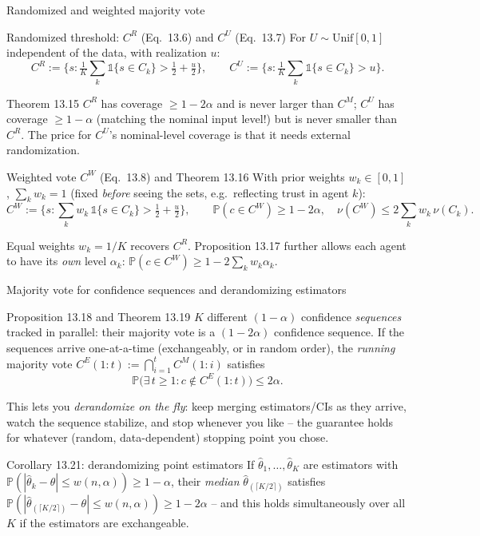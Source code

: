 \documentclass[aspectratio=169,10pt]{beamer}
\newcommand{\Pb}{\mathbb{P}}
\begin{document}
\begin{frame}{Randomized and weighted majority vote}
  \begin{block}{Randomized threshold: $C^R$ (Eq.\ 13.6) and $C^U$ (Eq.\ 13.7)}
    For $U\sim\mathrm{Unif}[0,1]$ independent of the data, with realization $u$:
    \[
      C^R := \Big\{s : \tfrac1K\textstyle\sum_k\mathbb{1}\{s\in C_k\} > \tfrac12+\tfrac u2\Big\}, \qquad
      C^U := \Big\{s : \tfrac1K\textstyle\sum_k\mathbb{1}\{s\in C_k\} > u\Big\}.
    \]
  \end{block}
  \begin{block}{Theorem 13.15}
    $C^R$ has coverage $\geq1-2\alpha$ and is never larger than $C^M$; $C^U$ has coverage $\geq1-\alpha$ (matching the nominal input level!) but is never smaller than $C^R$. The price for $C^U$'s nominal-level coverage is that it needs external randomization.
  \end{block}

  \begin{block}{Weighted vote $C^W$ (Eq.\ 13.8) and Theorem 13.16}
    With prior weights $w_k\in[0,1]$, $\sum_k w_k=1$ (fixed \emph{before} seeing the sets, e.g.\ reflecting trust in agent $k$):
    \[
      C^W := \Big\{s : \textstyle\sum_k w_k\,\mathbb{1}\{s\in C_k\} > \tfrac12+\tfrac u2\Big\}, \qquad
      \Pb(c\in C^W)\geq1-2\alpha, \quad \nu(C^W)\leq 2\textstyle\sum_k w_k\,\nu(C_k).
    \]
  \end{block}
  Equal weights $w_k=1/K$ recovers $C^R$. Proposition 13.17 further allows each agent to have its \emph{own} level $\alpha_k$: $\Pb(c\in C^W)\geq1-2\sum_k w_k\alpha_k$.
\end{frame}

\begin{frame}{Majority vote for confidence sequences and derandomizing estimators}
  \begin{block}{Proposition 13.18 and Theorem 13.19}
    $K$ different $(1-\alpha)$ confidence \emph{sequences} tracked in parallel: their majority vote is a $(1-2\alpha)$ confidence sequence. If the sequences arrive one-at-a-time (exchangeably, or in random order), the \emph{running} majority vote $C^E(1{:}t) := \bigcap_{i=1}^t C^M(1{:}i)$ satisfies
    \[
      \Pb\big(\exists\, t\geq1 : c\notin C^E(1{:}t)\big) \leq 2\alpha.
    \]
  \end{block}
  This lets you \emph{derandomize on the fly}: keep merging estimators/CIs as they arrive, watch the sequence stabilize, and stop whenever you like -- the guarantee holds for whatever (random, data-dependent) stopping point you chose.

  \begin{block}{Corollary 13.21: derandomizing point estimators}
    If $\hat\theta_1,\dots,\hat\theta_K$ are estimators with $\Pb(|\hat\theta_k-\theta|\le w(n,\alpha))\geq1-\alpha$, their \emph{median} $\hat\theta_{(\lceil K/2\rceil)}$ satisfies $\Pb(|\hat\theta_{(\lceil K/2\rceil)}-\theta|\le w(n,\alpha))\geq1-2\alpha$ -- and this holds simultaneously over all $K$ if the estimators are exchangeable.
  \end{block}
\end{frame}
\end{document}

